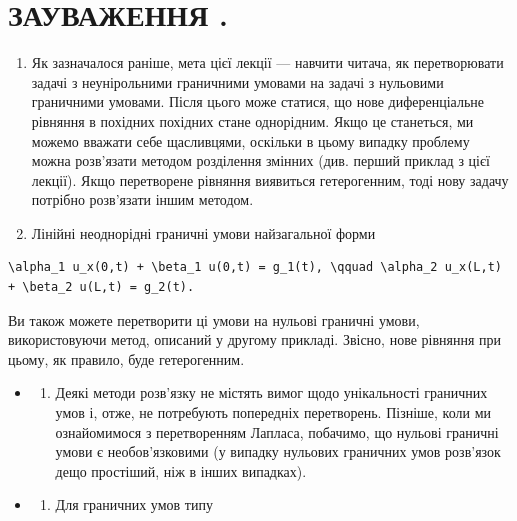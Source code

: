 \documentclass[
  ukrainian,
]{article}
\providecommand{\tightlist}{%
  \setlength{\itemsep}{0pt}\setlength{\parskip}{0pt}}
\begin{document}
\section{ЗАУВАЖЕННЯ
.}\label{ux437ux430ux443ux432ux430ux436ux435ux43dux43dux44f-.}

\begin{enumerate}
\def\labelenumi{\arabic{enumi}.}
\item
  Як зазначалося раніше, мета цієї лекції --- навчити читача, як
  перетворювати задачі з неунірольними граничними умовами на задачі з
  нульовими граничними умовами. Після цього може статися, що нове
  диференціальне рівняння в похідних похідних стане однорідним. Якщо це
  станеться, ми можемо вважати себе щасливцями, оскільки в цьому випадку
  проблему можна розв'язати методом розділення змінних (див. перший
  приклад з цієї лекції). Якщо перетворене рівняння виявиться
  гетерогенним, тоді нову задачу потрібно розв'язати іншим методом.
\item
  Лінійні неоднорідні граничні умови найзагальної форми
\end{enumerate}

\begin{verbatim}
\alpha_1 u_x(0,t) + \beta_1 u(0,t) = g_1(t), \qquad \alpha_2 u_x(L,t) + \beta_2 u(L,t) = g_2(t).
\end{verbatim}

Ви також можете перетворити ці умови на нульові граничні умови,
використовуючи метод, описаний у другому прикладі. Звісно, нове рівняння
при цьому, як правило, буде гетерогенним.

\begin{itemize}
\tightlist
\item
  \begin{enumerate}
  \def\labelenumi{\arabic{enumi}.}
  \setcounter{enumi}{2}
  \tightlist
  \item
    Деякі методи розв'язку не містять вимог щодо унікальності граничних
    умов і, отже, не потребують попередніх перетворень. Пізніше, коли ми
    ознайомимося з перетворенням Лапласа, побачимо, що нульові граничні
    умови є необов'язковими (у випадку нульових граничних умов розв'язок
    дещо простіший, ніж в інших випадках).
  \end{enumerate}
\item
  \begin{enumerate}
  \def\labelenumi{\arabic{enumi}.}
  \setcounter{enumi}{3}
  \tightlist
  \item
    Для граничних умов типу
  \end{enumerate}
\end{itemize}
\end{document}
